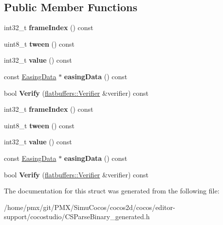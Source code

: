 \subsection*{Public Member Functions}
\begin{DoxyCompactItemize}
\item 
\mbox{\label{structflatbuffers_1_1IntFrame_a0bb0ef178e5412df784df85e00c61717}} 
int32\+\_\+t {\bfseries frame\+Index} () const
\item 
\mbox{\label{structflatbuffers_1_1IntFrame_a5411858ad1c38c83235eafeeefa98d5b}} 
uint8\+\_\+t {\bfseries tween} () const
\item 
\mbox{\label{structflatbuffers_1_1IntFrame_a8eabfbb774db0a329f002f208dce303e}} 
int32\+\_\+t {\bfseries value} () const
\item 
\mbox{\label{structflatbuffers_1_1IntFrame_ae333d28c96513f97309968ccd44e0ee0}} 
const \hyperlink{structflatbuffers_1_1EasingData}{Easing\+Data} $\ast$ {\bfseries easing\+Data} () const
\item 
\mbox{\label{structflatbuffers_1_1IntFrame_a848003fec5ac5f134a21c02fc5bceaed}} 
bool {\bfseries Verify} (\hyperlink{classflatbuffers_1_1Verifier}{flatbuffers\+::\+Verifier} \&verifier) const
\item 
\mbox{\label{structflatbuffers_1_1IntFrame_a0bb0ef178e5412df784df85e00c61717}} 
int32\+\_\+t {\bfseries frame\+Index} () const
\item 
\mbox{\label{structflatbuffers_1_1IntFrame_a5411858ad1c38c83235eafeeefa98d5b}} 
uint8\+\_\+t {\bfseries tween} () const
\item 
\mbox{\label{structflatbuffers_1_1IntFrame_a8eabfbb774db0a329f002f208dce303e}} 
int32\+\_\+t {\bfseries value} () const
\item 
\mbox{\label{structflatbuffers_1_1IntFrame_ae333d28c96513f97309968ccd44e0ee0}} 
const \hyperlink{structflatbuffers_1_1EasingData}{Easing\+Data} $\ast$ {\bfseries easing\+Data} () const
\item 
\mbox{\label{structflatbuffers_1_1IntFrame_a848003fec5ac5f134a21c02fc5bceaed}} 
bool {\bfseries Verify} (\hyperlink{classflatbuffers_1_1Verifier}{flatbuffers\+::\+Verifier} \&verifier) const
\end{DoxyCompactItemize}


The documentation for this struct was generated from the following file\+:\begin{DoxyCompactItemize}
\item 
/home/pmx/git/\+P\+M\+X/\+Simu\+Cocos/cocos2d/cocos/editor-\/support/cocostudio/C\+S\+Parse\+Binary\+\_\+generated.\+h\end{DoxyCompactItemize}
